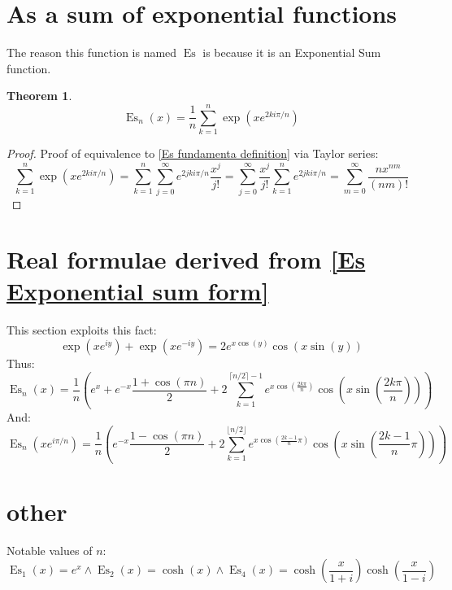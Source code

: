 \documentclass[]{article}
\DeclareMathOperator{\es}{Es}
\newcommand{\pqty}[1]{{\left(#1\right)}}
\newtheorem{theorem}{Theorem}[section]
\numberwithin{equation}{section}
\begin{document}
	
	
	\section{As a sum of exponential functions}
	The reason this function is named $\es$ is because it is an Exponential Sum function.
	\begin{theorem}
		\begin{equation}
		\label{Es Exponential sum form}
		\es_n\pqty{x}=
		\frac{1}{n}\sum _{k=1}^n \exp\pqty{xe^{2ki\pi/n}}
		\end{equation}
	\end{theorem}
	\begin{proof}
		Proof of equivalence to \eqref{Es fundamenta definition} via Taylor series:
		\begin{equation}
		\sum _{k=1}^n \exp\pqty{xe^{2ki\pi/n}}
		=
		\sum _{k=1}^n \sum _{j=0}^\infty e^{2jki\pi/n}\frac{x^j}{j!}
		=
		\sum _{j=0}^\infty \frac{x^j}{j!} \sum _{k=1}^n e^{2jki\pi/n}
		=
		\sum_{m=0}^{\infty}\frac{nx^{nm}}{\pqty{nm}!}
		\end{equation}
	\end{proof}
	
	
	\section{Real formulae derived from \eqref{Es Exponential sum form}}
	This section exploits this fact:
	\begin{equation}
	\exp\pqty{xe^{iy}}+\exp\pqty{xe^{-iy}}
	=
	2e^{x\cos\pqty{y}} \cos\pqty{x\sin\pqty{y}}
	\end{equation}
	Thus:
	\begin{equation}
	\label{Es trig sum form 1}
	\es_n\pqty{x}
	=
	\frac{1}{n}\pqty{
		e^x+e^{-x}\frac{1+\cos\pqty{\pi n}}{2} 
		+2\sum _{k=1}^{\lceil n/2\rceil-1}e^{x\cos\pqty{\frac{2k\pi}{n}}} \cos\pqty{x\sin\pqty{\frac{2k\pi}{n}}}
	}
	\end{equation}
	And:
	\begin{equation}
	\es_n\pqty{xe^{i\pi/n}}
	=
	\frac{1}{n}\pqty{
		e^{-x}\frac{1-\cos\pqty{\pi n}}{2}
		+2\sum _{k=1}^{\lfloor n/2\rfloor}e^{x\cos\pqty{\frac{2k-1}{n}\pi}} \cos\pqty{x\sin\pqty{\frac{2k-1}{n}\pi}}
	}
	\end{equation}
	
	
	
	\section{other}
	Notable values of \(n\):
	\begin{equation}
	\es_1\pqty{x}=e^x\land\es_2\pqty{x}=\cosh\pqty{x}\land\es_4\pqty{x}=\cosh\pqty{\frac{x}{1+i}}\cosh\pqty{\frac{x}{1-i}}
	\end{equation}
	
\end{document}
